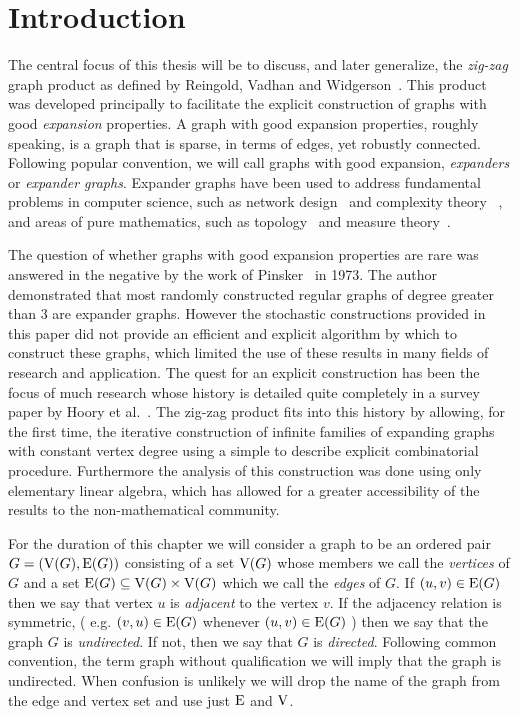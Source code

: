 \chapter{Introduction}
\label{chapt:intro}

The central focus of this thesis will be to discuss, and later generalize, the {\em zig-zag} graph product as defined by {Reingold, Vadhan and Widgerson}~\cite{Reingold:2002ys}. This product was developed principally to facilitate the explicit construction of graphs with good {\em expansion} properties. A graph with good expansion properties, roughly speaking, is a graph that is sparse, in terms of edges,  yet robustly connected. Following popular convention, we will call graphs with good expansion, {\em expanders } or {\em expander graphs}. Expander graphs have been used to address fundamental problems in computer science, such as network design~\cite{Nicholas-Pippenger:1987eu,Pippenger:1982nx} and complexity theory~\cite{Urquhart:1987cr,Valiant:1977dq} , and areas of pure mathematics, such as topology~\cite{MR1826251} and measure theory~\cite{Lubotzky:1994ve}.

The question of whether graphs with good expansion properties are rare was answered in the negative by the work of Pinsker~\cite{Pinsker:1973mz} in 1973. The author demonstrated that most randomly constructed regular graphs of degree greater than $3$ are expander graphs. However the stochastic constructions provided in this paper did not provide an efficient and explicit algorithm by which to construct these graphs, which limited the use of these results in many fields of research and application. The quest for an explicit construction has been the focus of much research whose history is detailed quite completely in a survey paper by Hoory {et al.}~\cite{Hoory:2006bh}. The zig-zag product fits into this history by allowing, for the first time, the iterative construction of infinite families of expanding graphs with constant vertex degree using a simple to describe explicit combinatorial procedure. Furthermore the analysis of this construction was done using only elementary linear algebra, which has allowed for a greater accessibility of the results to the non-mathematical community. 

For the duration of this chapter we will consider a graph to be an ordered pair $G = (\mathrm{V}(G), \mathrm{E}(G) )$ consisting of a set $\mathrm{V}(G)$ whose members we call the {\em vertices} of $G$ and a set $\mathrm{E}(G)  \subseteq \mathrm{V}(G) \times \mathrm{V}(G)$ which we call the {\em edges} of $G$. If $\left( u, v \right) \in \mathrm{E}(G) $ then we say that  vertex $u$ is {\em adjacent} to the vertex $v$. If the adjacency relation is symmetric, ( e.g. $\left(v,u\right) \in \mathrm{E}(G) $ whenever $\left(u,v\right) \in \mathrm{E}(G) $ )  then we say that the graph $G$ is {\em undirected}. If not, then we say that $G$ is {\em directed}. Following common convention,  the term graph without qualification we will imply that the graph is undirected.  When confusion is unlikely we will drop the name of the graph from the edge and vertex set and use just $\mathrm{E}$ and $\mathrm{V}$.

